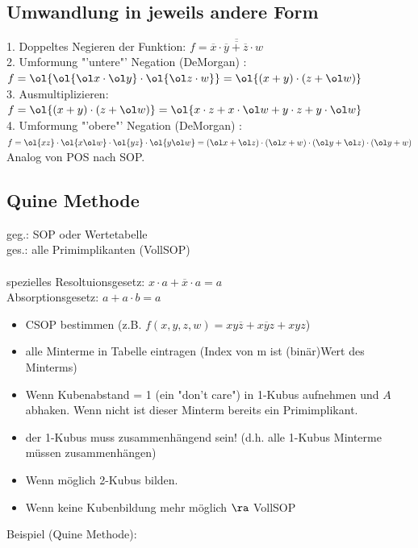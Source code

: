 \documentclass[6pt,a4paper]{scrartcl}
\begin{document}
\begin{multicols}{3}
\subsection{Umwandlung in jeweils andere Form}
1. Doppeltes Negieren der Funktion: $ f = \overline {\overline{\overline x \cdot \overline y + \overline z \cdot w}}$\\
2. Umformung "'untere"'  Negation (DeMorgan) : $ f = \ol{\ol{\ol x \cdot \ol y} \cdot \ol{\ol z \cdot w}} = \ol{(x+y) \cdot (z+\ol w)}$\\
3. Ausmultiplizieren: $ f = \ol{(x+y) \cdot (z+\ol w)} = \ol{x\cdot z + x\cdot \ol w + y \cdot z + y \cdot \ol w}$\\
4. Umformung "'obere"'  Negation (DeMorgan) :\\ $ f= \ol{xz} \cdot \ol{x \ol w} \cdot \ol{yz} \cdot \ol{y\ol w} = ( \ol x + \ol z) \cdot ( \ol x + w) \cdot ( \ol y + \ol z) \cdot ( \ol y + w)$\\
Analog von POS nach SOP.\\

\subsection{Quine Methode}
geg.: SOP oder Wertetabelle \\
ges.: alle Primimplikanten (VollSOP)  \\
\\
spezielles Resoltuionsgesetz: $x\cdot a + \overline x \cdot a = a$ \\
Absorptionsgesetz: $a + a\cdot b = a$

\begin{itemize}
	\item CSOP bestimmen (z.B. $f(x,y,z,w) = xy\overline z + x \overline y z + xyz$)
	\item alle Minterme in Tabelle eintragen (Index von m ist (binär)Wert des Minterms)
	\item Wenn Kubenabstand = 1 (ein "don't care") in 1-Kubus aufnehmen und $A$ abhaken. Wenn nicht ist dieser Minterm bereits ein Primimplikant.
	\item der 1-Kubus muss zusammenhängend sein! (d.h. alle 1-Kubus Minterme müssen zusammenhängen)
	\item Wenn möglich 2-Kubus bilden.
	\item Wenn keine Kubenbildung mehr möglich $\ra$ VollSOP
\end{itemize}
Beispiel (Quine Methode):


\end{multicols}
\end{document}
